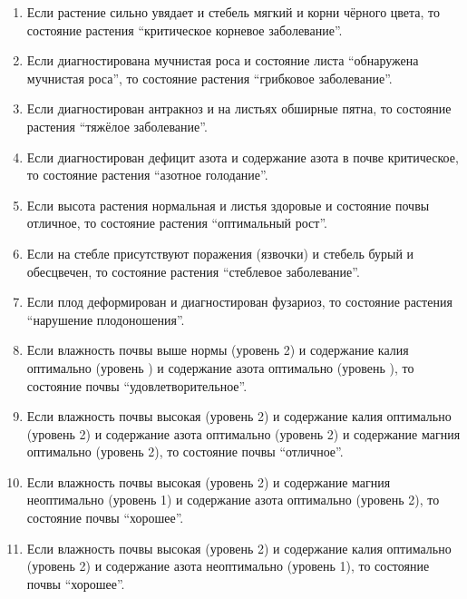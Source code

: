 \begin{enumerate}
    \item Если растение сильно увядает и стебель мягкий и корни чёрного цвета, то состояние растения \enquote{критическое корневое заболевание}.

    \item Если диагностирована мучнистая роса и состояние листа \enquote{обнаружена мучнистая роса}, то состояние растения \enquote{грибковое заболевание}.

    \item Если диагностирован антракноз и на листьях обширные пятна, то состояние растения \enquote{тяжёлое заболевание}.

    \item Если диагностирован дефицит азота и содержание азота в почве критическое, то состояние растения \enquote{азотное голодание}.

    \item Если высота растения нормальная и листья здоровые и состояние почвы отличное, то состояние растения \enquote{оптимальный рост}.

    \item Если на стебле присутствуют поражения (язвочки) и стебель бурый и обесцвечен, то состояние растения \enquote{стеблевое заболевание}.

    \item Если плод деформирован и диагностирован фузариоз, то состояние растения \enquote{нарушение плодоношения}.

    \item Если влажность почвы выше нормы (уровень 2) и содержание калия оптимально (уровень ) и содержание азота оптимально (уровень ), то состояние почвы \enquote{удовлетворительное}.

    \item Если влажность почвы высокая (уровень 2) и содержание калия оптимально (уровень 2) и содержание азота оптимально (уровень 2) и содержание магния оптимально (уровень 2), то состояние почвы \enquote{отличное}.

    \item Если влажность почвы высокая (уровень 2) и содержание магния неоптимально (уровень 1) и содержание азота оптимально (уровень 2), то состояние почвы \enquote{хорошее}.

    \item Если влажность почвы высокая (уровень 2) и содержание калия оптимально (уровень 2) и содержание азота неоптимально (уровень 1), то состояние почвы \enquote{хорошее}.


\end{enumerate}
